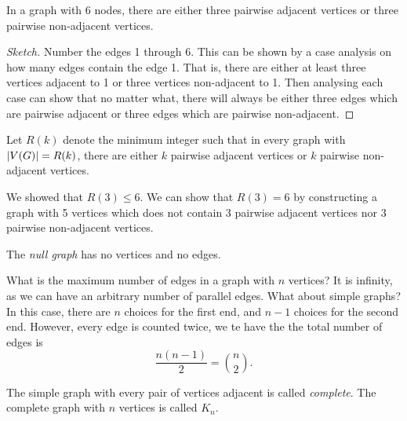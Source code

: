 \documentclass[12pt]{book}
\begin{document}
\begin{proposition}
In a graph with 6 nodes, there are either three pairwise adjacent vertices or three pairwise non-adjacent vertices.
\end{proposition}

\begin{proof}[Sketch]
Number the edges 1 through 6.
This can be shown by a case analysis on how many edges contain the edge 1.
That is, there are either at least three vertices adjacent to 1 or three vertices non-adjacent to 1.
Then analysing each case can show that no matter what, there will always be either three edges which are pairwise adjacent or three edges which are pairwise non-adjacent.
\end{proof}

\begin{definition}
Let \( R(k) \) denote the minimum integer such that in every graph with \( \lvert V(G)\rvert = R(k) \), there are either \( k \) pairwise adjacent vertices or \( k \) pairwise non-adjacent vertices.
\end{definition}

\begin{note}
We showed that \( R(3) \leq 6 \).
We can show that \( R(3) = 6 \) by constructing a graph with 5 vertices which does not contain 3 pairwise adjacent vertices nor 3 pairwise non-adjacent vertices.
\end{note}

\begin{definition}
The \emph{null graph} has no vertices and no edges.
\end{definition}

\begin{note}
What is the maximum number of edges in a graph with \( n \) vertices?
It is infinity, as we can have an arbitrary number of parallel edges.
What about simple graphs?
In this case, there are \( n \) choices for the first end, and \( n-1 \) choices for the second end.
However, every edge is counted twice, we te have the the total number of edges is
\[ \frac{n (n-1)}2 = \binom n 2. \]
\end{note}

\begin{definition}
The simple graph with every pair of vertices adjacent is called \emph{complete}. The complete graph with \( n \) vertices is called \( K_n \).
\end{definition}
\end{document}
